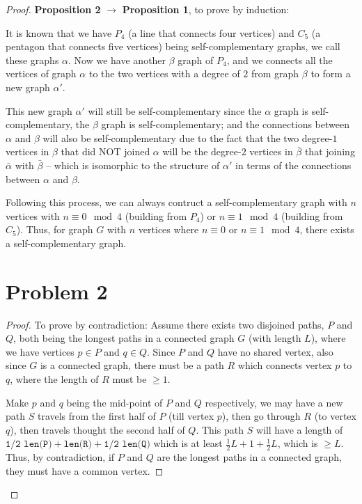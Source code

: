 \documentclass[12pt]{article}
\newcommand{\ilc}{\texttt}
\begin{document}
\begin{proof}
\textbf{Proposition 2} $\longrightarrow$ \textbf{Proposition 1}, to prove by induction:\newline

It is known that we have $P_4$ (a line that connects four vertices) and $C_5$ (a pentagon that connects five vertices) being self-complementary graphs, we call these graphs $\alpha$. Now we have another $\beta$ graph of $P_4$, and we connects all the vertices of graph $\alpha$ to the two vertices with a degree of $2$ from graph $\beta$ to form a new graph $\alpha'$.

This new graph $\alpha'$ will still be self-complementary since the $\alpha$ graph is self-complementary, the $\beta$ graph is self-complementary; and the connections between $\alpha$ and $\beta$ will also be self-complementary due to the fact that the two degree-$1$ vertices in $\beta$ that did NOT joined $\alpha$ will be the degree-$2$ vertices in $\bar{\beta}$ that joining $\bar{\alpha}$ with $\bar{\beta}$ -- which is isomorphic to the structure of $\alpha'$ in terms of the connections between $\alpha$ and $\beta$.\newline

Following this process, we can always contruct a self-complementary graph with $n$ vertices with $n \equiv 0 \mod 4$ (building from $P_4$)  or $n \equiv 1 \mod 4$ (building from $C_5$). Thus, for graph $G$ with $n$ vertices where $n \equiv 0$ or $n \equiv 1 \mod 4$, there exists a self-complementary graph.
\section{Problem 2}

\begin{proof}
To prove by contradiction:\newline
Assume there exists two disjoined paths, $P$ and $Q$, both being the longest paths in a connected graph $G$ (with length $L$), where we have vertices $p \in P$ and $q \in Q$. Since $P$ and $Q$ have no shared vertex, also since $G$ is a connected graph, there must be a path $R$ which connects vertex $p$ to $q$, where the length of $R$ must be $\geq 1$.

Make $p$ and $q$ being the mid-point of $P$ and $Q$ respectively, we may have a new path $S$ travels from the first half of $P$ (till vertex $p$), then go through $R$ (to vertex $q$), then travels thought the second half of $Q$. This path $S$ will have a length of $\ilc{1/2 len(P)} + \ilc{len(R)} + \ilc{1/2 len(Q)}$ which is at least $\frac{1}{2}L + 1 + \frac{1}{2}L$, which is $\geq L$. Thus, by contradiction, if $P$ and $Q$ are the longest paths in a connected graph, they must have a common vertex.


\end{proof}
\end{proof}
\end{document}
